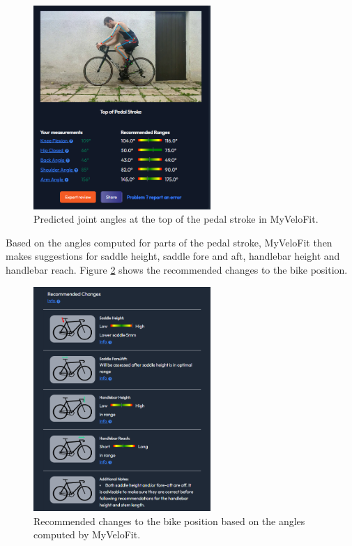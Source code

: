 \begin{figure}[htbp]
    \centering
    \includegraphics[width=0.6\textwidth]{obrazky-figures/myvelofit_top.png}
    \caption{Predicted joint angles at the top of the pedal stroke in MyVeloFit.}
    \label{fig:myvelofit_top}
\end{figure}

Based on the angles computed for parts of the pedal stroke, MyVeloFit then makes suggestions for saddle height, saddle fore and aft, handlebar height and handlebar reach. Figure \ref{fig:myvelofit_suggestions} shows the recommended changes to the bike position.

\begin{figure}[htbp]
    \centering
    \includegraphics[width=0.6\textwidth]{obrazky-figures/myvelofit_suggestions.png}
    \caption{Recommended changes to the bike position based on the angles computed by MyVeloFit.}
    \label{fig:myvelofit_suggestions}
\end{figure}


